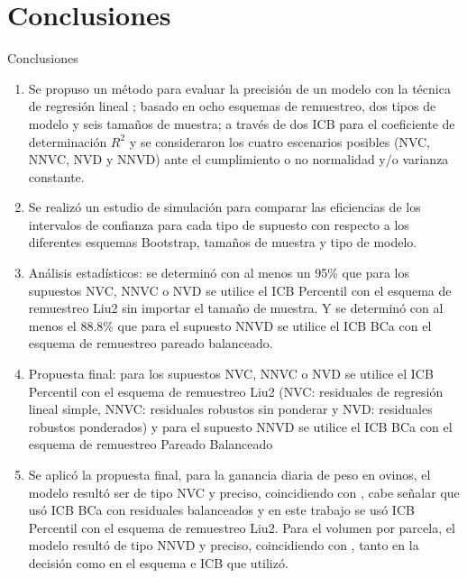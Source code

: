 \documentclass[serif, aspectratio=169]{beamer}
\begin{document}
\section{Conclusiones}
\begin{frame}{Conclusiones}
	
	\begin{enumerate}
		\item 	Se propuso un método para evaluar la precisión de un modelo con la técnica de regresión lineal ; basado en ocho esquemas de remuestreo, dos tipos de modelo y seis tamaños de muestra; a través de dos ICB para el coeficiente de determinación $R^2$ y se consideraron los cuatro escenarios posibles (NVC, NNVC, NVD y NNVD) ante el cumplimiento o no normalidad y/o varianza constante.
	
		\item 	Se realizó un estudio de simulación para comparar las eficiencias de los intervalos de confianza para cada tipo de supuesto con respecto a los diferentes esquemas Bootstrap, tamaños de muestra y tipo de modelo.
	
		\item 	Análisis estadísticos: se determinó con al menos un 95\% que para los supuestos NVC, NNVC o NVD se utilice el ICB Percentil con el esquema de remuestreo Liu2 sin importar el tamaño de muestra. Y se determinó con al menos el 88.8\% que para el supuesto NNVD se utilice el ICB BCa con el esquema de remuestreo pareado balanceado.
	\end{enumerate}

\end{frame}


\begin{frame}
	\begin{enumerate}
		\setcounter{enumi}{3}
		\item 	Propuesta final: para los supuestos NVC, NNVC o NVD se utilice el ICB Percentil con el esquema de remuestreo Liu2 (NVC: residuales de regresión lineal simple, NNVC: residuales robustos sin ponderar y NVD: residuales robustos ponderados) y para el supuesto NNVD se utilice el ICB BCa con el esquema de remuestreo Pareado Balanceado
		
		\item 	Se aplicó la propuesta final, para la ganancia diaria de peso en ovinos, el modelo resultó ser de tipo NVC y preciso, coincidiendo con \textcite{balam-2012}, cabe señalar que usó ICB BCa con residuales balanceados y en este trabajo se usó ICB Percentil con el esquema de remuestreo Liu2. Para el volumen por parcela, el modelo resultó de tipo NNVD y preciso, coincidiendo con \textcite{balam-2012} , tanto en la decisión como en el esquema e ICB que utilizó.
	\end{enumerate}
	
	
\end{frame}
\end{document}
